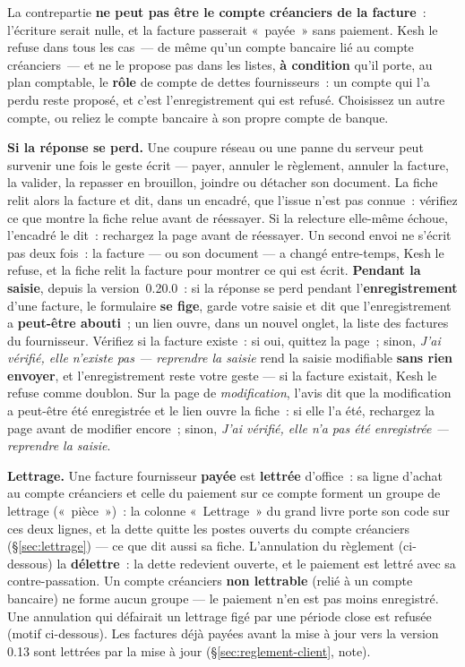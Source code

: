 \documentclass[a4paper,11pt,oneside]{article}
\begin{document}
La contrepartie \textbf{ne peut pas être le compte créanciers de la facture}~: l'écriture serait
nulle, et la facture passerait «~payée~» sans paiement. Kesh le refuse dans tous les cas~--- de
même qu'un compte bancaire lié au compte créanciers~--- et ne le propose pas dans les listes,
\textbf{à condition} qu'il porte, au plan comptable, le \textbf{rôle} de compte de dettes
fournisseurs~: un compte qui l'a perdu reste proposé, et c'est l'enregistrement qui est refusé.
Choisissez un autre compte, ou reliez le compte bancaire à son propre compte de banque.

\textbf{Si la réponse se perd.} Une coupure réseau ou une panne du serveur peut survenir une fois
le geste écrit --- payer, annuler le règlement, annuler la facture, la valider, la repasser en
brouillon, joindre ou détacher son document. La fiche relit alors la facture et dit, dans un
encadré, que l'issue n'est pas connue~: vérifiez ce que montre la fiche relue avant de réessayer.
Si la relecture elle-même échoue, l'encadré le dit~: rechargez la page avant de réessayer. Un second
envoi ne s'écrit pas deux fois~: la facture --- ou son document --- a changé entre-temps, Kesh le
refuse, et la fiche relit la facture pour montrer ce qui est écrit. \textbf{Pendant la saisie},
depuis la version~0.20.0~: si la réponse se perd pendant l'\textbf{enregistrement} d'une facture,
le formulaire \textbf{se fige}, garde votre saisie et dit que l'enregistrement a \textbf{peut-être
abouti}~; un lien ouvre, dans un nouvel onglet, la liste des factures du fournisseur. Vérifiez si
la facture existe~: si oui, quittez la page~; sinon, \emph{J'ai vérifié, elle n'existe pas ---
reprendre la saisie} rend la saisie modifiable \textbf{sans rien envoyer}, et l'enregistrement
reste votre geste --- si la facture existait, Kesh le refuse comme doublon. Sur la page de
\emph{modification}, l'avis dit que la modification a peut-être été enregistrée et le lien ouvre
la fiche~: si elle l'a été, rechargez la page avant de modifier encore~; sinon, \emph{J'ai
vérifié, elle n'a pas été enregistrée --- reprendre la saisie}.

\textbf{Lettrage.} Une facture fournisseur \textbf{payée} est \textbf{lettrée} d'office~: sa
ligne d'achat au compte créanciers et celle du paiement sur ce compte forment un groupe de
lettrage («~pièce~»)~: la colonne «~Lettrage~» du grand livre porte son code sur ces deux lignes,
et la dette quitte les postes ouverts du compte créanciers (\S\ref{sec:lettrage}) --- ce que dit
aussi sa fiche. L'annulation du
règlement (ci-dessous) la \textbf{délettre}~: la dette redevient ouverte, et le paiement est
lettré avec sa contre-passation. Un compte créanciers \textbf{non lettrable} (relié à un compte
bancaire) ne forme aucun groupe --- le paiement n'en est pas moins enregistré. Une annulation qui
défairait un lettrage figé par une période close est refusée (motif ci-dessous). Les factures
déjà payées avant la mise à jour vers la version 0.13 sont lettrées par la mise à jour
(\S\ref{sec:reglement-client}, note).
\end{document}
